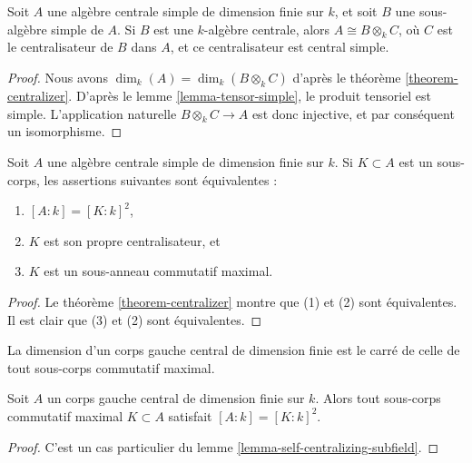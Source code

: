 \begin{lemma}
\label{lemma-when-tensor-is-equal}
Soit $A$ une algèbre centrale simple de dimension finie sur $k$, et soit
$B$ une sous-algèbre simple de $A$. Si $B$ est une
$k$-algèbre centrale, alors $A \cong B \otimes_k C$, où $C$ est le centralisateur
de $B$ dans $A$, et ce centralisateur est central simple.
\end{lemma}

\begin{proof}
Nous avons $\dim_k(A) = \dim_k(B \otimes_k C)$ d'après le
théorème \ref{theorem-centralizer}. D'après le
lemme \ref{lemma-tensor-simple},
le produit tensoriel est simple. L'application naturelle
$B \otimes_k C \to A$ est donc injective, et par conséquent un isomorphisme.
\end{proof}

\begin{lemma}
\label{lemma-self-centralizing-subfield}
Soit $A$ une algèbre centrale simple de dimension finie sur $k$.
Si $K \subset A$ est un sous-corps, les assertions suivantes sont équivalentes :
\begin{enumerate}
\item $[A : k] = [K : k]^2$,
\item $K$ est son propre centralisateur, et
\item $K$ est un sous-anneau commutatif maximal.
\end{enumerate}
\end{lemma}

\begin{proof}
Le théorème \ref{theorem-centralizer}
montre que (1) et (2) sont équivalentes.
Il est clair que (3) et (2) sont équivalentes.
\end{proof}

\begin{lemma}
\label{lemma-maximal-subfield}
\begin{slogan}
La dimension d'un corps gauche central de dimension finie est le carré de celle
de tout sous-corps commutatif maximal.
\end{slogan}
Soit $A$ un corps gauche central de dimension finie sur $k$.
Alors tout sous-corps commutatif maximal $K \subset A$ satisfait
$[A : k] = [K : k]^2$.
\end{lemma}

\begin{proof}
C'est un cas particulier du lemme \ref{lemma-self-centralizing-subfield}.
\end{proof}





